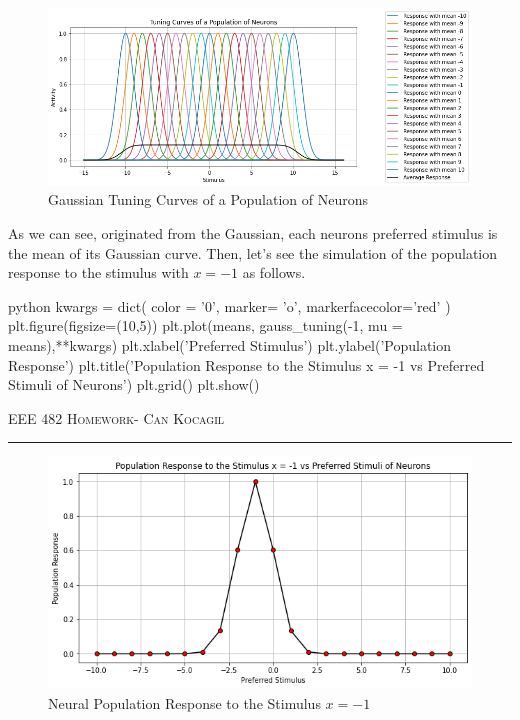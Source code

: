 \documentclass[12pt]{amsart}
\begin{document}
\begin{figure}[h]
    \centering
        \includegraphics[width = 1\textwidth]{images/Q2/tuning_curves.png}
        \caption{Gaussian Tuning Curves of a Population of Neurons}
\end{figure}

As we can see, originated from the Gaussian, each neurons preferred stimulus is the mean of its Gaussian curve. Then, let's see the simulation of the population response to the stimulus with $x = -1$ as follows.


\begin{mintedbox}{python}
kwargs = dict(
            color = '0',
            marker= 'o',
            markerfacecolor='red'
)
plt.figure(figsize=(10,5))
plt.plot(means, gauss_tuning(-1, mu = means),**kwargs)
plt.xlabel('Preferred Stimulus')
plt.ylabel('Population Response')
plt.title('Population Response to the Stimulus x = -1 vs Preferred Stimuli of Neurons')
plt.grid()
plt.show()
\end{mintedbox}

\newpage
{\scshape EEE 482} \hfill {\scshape \large  Homework-\relax} \hfill {\scshape Can Kocagil}
\smallskip
\hrule
\vspace{2mm}

\begin{figure}[h]
    \centering
        \includegraphics[width = 1\textwidth]{images/Q2/preferred_stimulis.png}
        \caption{Neural Population Response to the Stimulus $x = -1$}
\end{figure}
\end{document}
